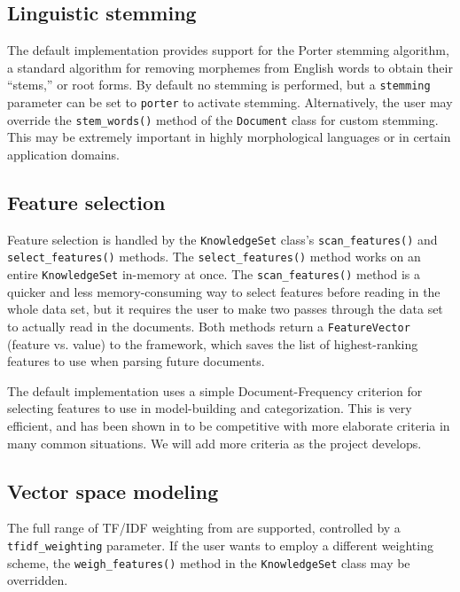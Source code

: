 \documentclass[twocolumn]{article}
\begin{document}
\subsection*{Linguistic stemming}
The default implementation provides support for the Porter stemming
algorithm, a standard algorithm for removing morphemes from English
words to obtain their ``stems,'' or root forms.  By default no
stemming is performed, but a \texttt{stemming} parameter can be set to
\texttt{porter} to activate stemming.  Alternatively, the user may
override the \texttt{stem\_words()} method of the \texttt{Document}
class for custom stemming.  This may be extremely important in highly
morphological languages or in certain application domains.

\subsection*{Feature selection}
Feature selection is handled by the \texttt{KnowledgeSet} class's
\texttt{scan\_features()} and \texttt{select\_features()} methods.
The \texttt{select\_features()} method works on an entire
\texttt{KnowledgeSet} in-memory at once.  The
\texttt{scan\_features()} method is a quicker and less
memory-consuming way to select features before reading in the whole
data set, but it requires the user to make two passes through the data
set to actually read in the documents.  Both methods return a
\texttt{FeatureVector} (feature vs. value) to the framework, which
saves the list of highest-ranking features to use when parsing future
documents.

The default implementation uses a simple Document-Frequency criterion
for selecting features to use in model-building and categorization.
This is very efficient, and has been shown in \cite{yang:97} to be
competitive with more elaborate criteria in many common situations.
We will add more criteria as the project develops.

\subsection*{Vector space modeling}
The full range of TF/IDF weighting from \cite{salton:88} are
supported, controlled by a \texttt{tfidf\_weighting} parameter.  If
the user wants to employ a different weighting scheme, the
\texttt{weigh\_features()} method in the \texttt{KnowledgeSet} class
may be overridden.
\end{document}
